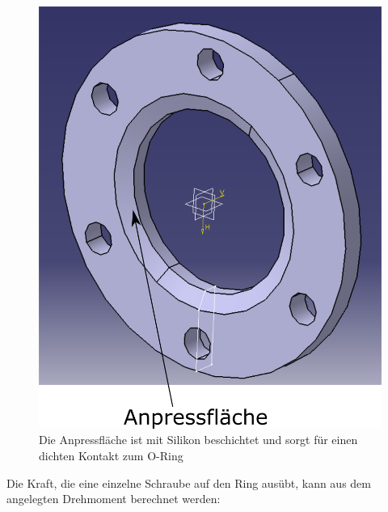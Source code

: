 \begin{figure}[h]
		\begin{center}
			\includegraphics[scale=0.37]{Deckplatte_unten.png}
			\caption{Die Anpressfläche ist mit Silikon beschichtet und sorgt für einen dichten Kontakt zum O-Ring}
		\end{center}
\end{figure}

Die Kraft, die eine einzelne Schraube auf den Ring ausübt, kann aus dem angelegten Drehmoment berechnet werden:

